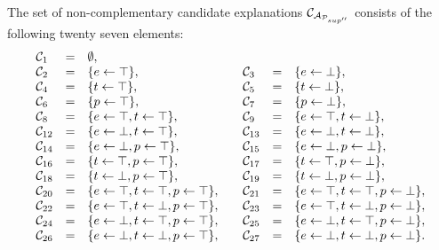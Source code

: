 \begin{tcolorbox}
\begin{example}
The set of non-complementary candidate explanations $\mathcal{C}_{\mathcal{A}_{\mathcal{P}_{sup''}}}$ consists of the following twenty seven elements:
\[
\begin{array}{lclclcl}
\mathcal{C}_1&=&\emptyset, &&&& \\
\mathcal{C}_2 &=& \{e \leftarrow \top\}, && \mathcal{C}_3 &=& \{e \leftarrow \bot\}, \\
\mathcal{C}_4 &=& \{t \leftarrow \top\}, && \mathcal{C}_5 &=& \{t \leftarrow \bot\}, \\
\mathcal{C}_6 &=& \{p \leftarrow \top\}, && \mathcal{C}_7 &=& \{p \leftarrow \bot\}, \\
\mathcal{C}_8 &=& \{e \leftarrow \top, t \leftarrow \top\}, && \mathcal{C}_9 &=& \{e \leftarrow \top, t \leftarrow \bot\}, \\
\mathcal{C}_{12} &=& \{e \leftarrow \bot, t \leftarrow \top\}, && \mathcal{C}_{13} &=& \{e \leftarrow \bot, t \leftarrow \bot\}, \\
 \mathcal{C}_{14} &=& \{e \leftarrow \bot, p \leftarrow \top\}, && \mathcal{C}_{15} &=& \{e \leftarrow \bot, p \leftarrow \bot\}, \\
\mathcal{C}_{16} &=& \{t \leftarrow \top, p \leftarrow \top\}, && \mathcal{C}_{17} &=& \{t \leftarrow \top, p \leftarrow \bot\}, \\
\mathcal{C}_{18} &=& \{t \leftarrow \bot, p \leftarrow \top\}, && \mathcal{C}_{19} &=& \{t \leftarrow \bot, p \leftarrow \bot\}, \\
\mathcal{C}_{20} &=& \{e \leftarrow \top, t \leftarrow \top, p \leftarrow \top\}, && \mathcal{C}_{21} &=& \{e \leftarrow \top, t \leftarrow \top, p \leftarrow \bot\}, \\
\mathcal{C}_{22} &=& \{e \leftarrow \top, t \leftarrow \bot, p \leftarrow \top\}, && \mathcal{C}_{23} &=& \{e \leftarrow \top, t \leftarrow \bot, p \leftarrow \bot\}, \\	     
\mathcal{C}_{24} &=& \{e \leftarrow \bot, t \leftarrow \top, p \leftarrow \top\}, && \mathcal{C}_{25} &=& \{e \leftarrow \bot, t \leftarrow \top, p \leftarrow \bot\}, \\	
\mathcal{C}_{26} &=& \{e \leftarrow \bot, t \leftarrow \bot, p \leftarrow \top\}, && \mathcal{C}_{27} &=& \{e \leftarrow \bot, t \leftarrow \bot, p \leftarrow \bot\}. 	
\end{array}
\]
\end{example}
\end{tcolorbox}
\vspace*{\fill}

